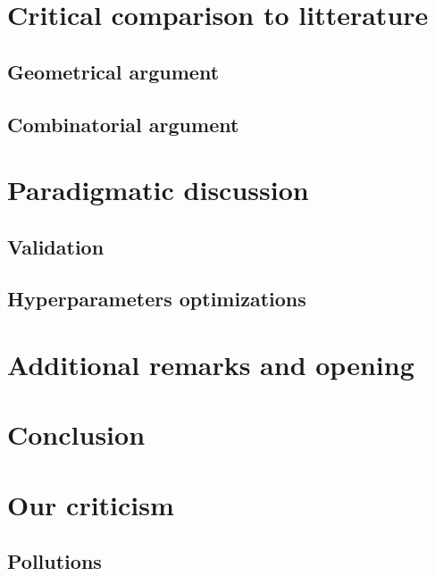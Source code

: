 \documentclass[11pt]{article}
\begin{document}
\section{Critical comparison to litterature}


\subsection{Geometrical argument}


\subsection{Combinatorial argument}



\section{Paradigmatic discussion}



\subsection{Validation}


\subsection{Hyperparameters optimizations}



\section{Additional remarks and opening}



\section{Conclusion}



\section{Our criticism}



\subsection{Pollutions}
\end{document}
